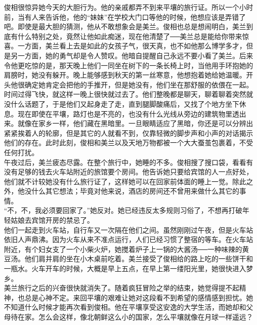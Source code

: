 俊相很惊异她今天的大胆行为。他的亲戚都弄不到来平壤的旅行证。所以一个小时前，当有人来告诉他，他的“妹妹”在学校大门口等他的时候，他想应该是弄错了吧。即使是最大胆的猜测，他从不敢想象会是美兰。俊相也总是想闹明白，美兰到底有什么特别之处，竟然让他如此痴迷，现在他清楚了──美兰总是能给你带来惊喜。一方面，美兰看上去是如此的女孩子气，很天真，也不如他那么博学多才，但是另一方面，她的勇气却是令人赞叹。他暗自提醒自己永远不要小看了美兰。后来令他更吃惊的是，那天晚上他们一同坐在树下的一条长椅上时，当他用手环抱她的肩膀时，她没有躲开。晚上能够感到秋天的第一丝寒意，他想抱着她给她温暖。开头他很确定她肯定会把他的手推开，但是她没有，他们坐在那舒服的依偎在一起。\\

时间过得飞快，就这样一晚上很快就过去了。他们整晚都是聊天，聊着聊着突然就没什么话题了，于是他们又起身走了走，直到腿脚酸痛后，又找了个地方坐下休息。现在即使在平壤，路灯也是不亮的，也没有什么光线从旁边的建筑物里透出来。就像在家乡一样，他们藏在黑暗里。一旦眼睛适应了黑暗，你还是可以分辨出紧紧挨着人的轮廓，但是其它的人就看不到，仅靠轻微的脚步声和小声的对话揭示他们的存在。此时此刻，俊相和美兰以及天地万物都被一个大大蚕茧包裹着，不受任何打扰。\\

午夜过后，美兰疲态尽露。在整个旅行中，她睡的不多。俊相搜了搜口袋，看看有没有足够的钱去火车站附近的旅馆要个房间。他告诉她只要给宾馆的人一点好处，他们就不计较她没有什么旅行证了，这样她可以在回家前体面的睡上一觉。除此之外，他没什么其它想法；毕竟对他来说，酒店的房间还不曾用来做什么其它的事情。\\

“不，不，我必须要回家了。”她反对。她已经违反太多规则习俗了，不想再打破年轻姑娘去宾馆开房的禁忌了。\\

他们一起走到火车站，自行车又一次隔在他们之间。虽然刚刚过午夜，但是火车站依旧人声鼎沸。因为火车从来不准点运行，人们已经习惯了整宿的等车。在火车站附近，有个妇女支了一个小柴火炉，她搅着炉子上一锅的大酱汤──一种味辣的黄豆汤。他们肩并肩的坐在小木桌前吃着。美兰接受了俊相给的路上吃的一些饼干和一瓶水。火车开车的时候，大概是早上五点，在早上第一缕阳光里，她很快进入梦乡。\\

美兰旅行之后的兴奋很快就消失了。随着疯狂冒险之举的结束，她觉得提不起精神，也总是心神不定。来回平壤的艰难让她对这段看不到希望的感情感到担忧。她不知道什么时候才能再次看到俊相。他在平壤享受这安逸的大学生活，而她却和父母待在家。怎么会这样，像北朝鲜这么小的国家，怎么平壤就像在月球一样遥远？\\

